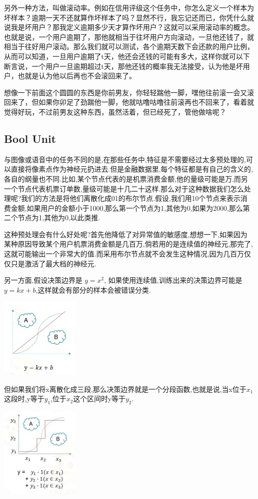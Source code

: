 \documentclass{article}
\begin{document}
另外一种方法，叫做滚动率。例如在信用评级这个任务中，你怎么定义一个样本为坏样本？逾期一天不还就算作坏样本了吗？显然不行，我忘记还而已，你凭什么就说我是坏用户？那我定义逾期多少天才算作坏用户？这就可以采用滚动率的概念。也就是说，一个用户逾期了，那他就相当于往坏用户方向滚动，一旦他还钱了，就相当于往好用户滚动。那么我们就可以测试，各个逾期天数下会还款的用户比例，从而可以知道，一旦用户逾期了t天，他还会还钱的可能有多大，这样你就可以下断言说，一个用户一旦逾期超过t天，那他还钱的概率我无法接受，认为他是坏用户，也就是认为他以后再也不会滚回来了。

想像一下前面这个圆圆的东西是你前男友，你轻轻踹他一脚，嘿他往前滚一会又滚回来了，但如果你卯足了劲踹他一脚，他就咕噜咕噜往前滚再也不回来了，看着就觉得好玩，不过前男友这种东西，虽然活着，但已经死了，管他做啥呢？
\subsection{Bool Unit}
与图像或语音中的任务不同的是,在那些任务中,特征是不需要经过太多预处理的,可以直接将像素点作为神经元扔进去.但是金融数据里,每个特征都是有自己的含义的,各自的纲量也不同.比如,某个节点代表的是机票消费金额,他的量级可能是万,而另一个节点代表机票订单数,量级可能是十几二十这样.那么对于这种数据我们怎么处理呢?我们的方法是将他们离散化成01的布尔节点.假设,我们用10个节点来表示消费金额,如果用户的金额小于1000,那么第一个节点为1,其他为0,如果为2000,那么第二个节点为1,其他为0,以此类推.

这种预处理会有什么好处呢?首先他降低了对异常值的敏感度,想想一下,如果因为某种原因导致某个用户机票消费金额是几百万,倘若用的是连续值的神经元,那完了,这就可能输出一个非常大的值.而采用布尔节点就不会发生这种情况,因为几百万仅仅只是激活了最大档的神经元.

另一方面,假设决策边界是 $ y=x^2 $, 如果使用连续值,训练出来的决策边界可能是$ y=kx+b $,这样就会有部分的样本会被错误分类.

\begin{center}
\includegraphics[width=1.5in]{image/image271.jpg}
\end{center}

但如果我们将x离散化成三段,那么决策边界就是一个分段函数,也就是说,当x位于$x_1$这段时,y等于$y_1$,位于$x_2$这个区间时y等于$y_2$.
\begin{center}
\includegraphics[width=1.5in]{image/image272.jpg}
\end{center}
\end{document}
